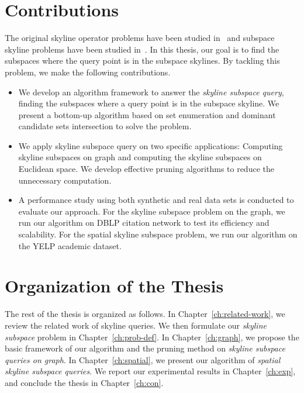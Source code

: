 \section{Contributions}
The original skyline operator problems have been studied in~\cite{borzsony2001skyline, chomicki2003skyline} and subspace skyline problems have been studied in~\cite{pei2005catching, yuan2005efficient}. In this thesis, our goal is to find the subspaces where the query point is in the subspace skylines. By tackling this problem, we make the following contributions.

\begin{itemize}
\item We develop an algorithm framework to answer the \emph{skyline subspace query}, finding the subspaces where a query point is in the subspace skyline. We present a bottom-up algorithm based on set enumeration and dominant candidate sets intersection to solve the problem.

\item We apply skyline subspace query on two specific applications: Computing skyline subspaces on graph and computing the skyline subspaces on Euclidean space. We develop effective pruning algorithms to reduce the unnecessary computation.

\item A performance study using both synthetic and real data sets is conducted to evaluate our approach. For the skyline subspace problem on the graph, we run our algorithm on DBLP citation network to test its efficiency and scalability. For the spatial skyline subspace problem, we run our algorithm on the YELP academic dataset.
\end{itemize}
  

\section{Organization of the Thesis}
The rest of the thesis is organized as follows. In Chapter~\ref{ch:related-work}, we review the related work of skyline queries. We then formulate our \emph{skyline subspace} problem in Chapter~\ref{ch:prob-def}. In Chapter~\ref{ch:graph}, we propose the basic framework of our algorithm and the pruning method on \emph{skyline subspace queries on graph}.  In Chapter~\ref{ch:spatial}, we present our algorithm of \emph{spatial skyline subspace queries}.  We report our experimental results in Chapter~\ref{ch:exp}, and conclude the thesis in Chapter~\ref{ch:con}.










